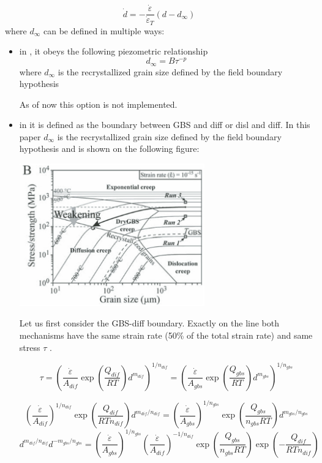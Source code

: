 \documentclass[a4paper]{article}
\begin{document}
\[
\dot{d} = -\frac{\dot\varepsilon}{\dot\varepsilon_T} (d-d_\infty)
\]
where $d_\infty$ can be defined in multiple ways:
\begin{itemize}
\item in \textcite{brcp99}, it obeys the following piezometric relationship
\[
d_\infty = B \tau^{-p}
\]
where $d_\infty$ is the recrystallized grain size defined
by the field boundary hypothesis

As of now this option is not implemented.

\item in \textcite{prgu09} it is defined as the boundary between
GBS and diff or disl and diff.
In this paper $d_\infty$ is the recrystallized grain size defined
by the field boundary hypothesis
and is  shown on the following figure:

\begin{center}
\includegraphics[width=8cm]{images/prgu09}
\end{center}

Let us first consider the GBS-diff boundary. Exactly on the line 
both mechanisms have the same strain rate (50\% of the total strain rate)
and same stress $\tau$ .

\[
\tau
=
\left(\frac{\dot\varepsilon}{A_{dif}}\exp\left(\frac{Q_{dif}}{RT} \right) d^{m_{dif}} \right)^{1/n_{dif}}
=
\left(\frac{\dot\varepsilon}{A_{gbs}} \exp\left(\frac{Q_{gbs}}{RT} \right)  d^{m_{gbs}} \right)^{1/n_{gbs}}
\]

\[
\left(\frac{\dot\varepsilon}{A_{dif}}  \right)^{1/n_{dif}}
\exp\left(\frac{Q_{dif}}{RT n_{dif}} \right) d^{m_{dif}/n_{dif}} 
=
\left(\frac{\dot\varepsilon}{A_{gbs}} \right)^{1/n_{gbs}}
 \exp\left(\frac{Q_{gbs}}{n_{gbs}RT} \right)  d^{m_{gbs}/n_{gbs}}
\]
\[
d^{m_{dif}/n_{dif}}  d^{-m_{gbs}/n_{gbs}}
=
\left(\frac{\dot\varepsilon}{A_{gbs}} \right)^{1/n_{gbs}}
\left(\frac{\dot\varepsilon}{A_{dif}}  \right)^{-1/n_{dif}}
\exp\left(\frac{Q_{gbs}}{n_{gbs}RT} \right)  
\exp\left(-\frac{Q_{dif}}{RT n_{dif}} \right) 
\]


\end{itemize}
\end{document}
